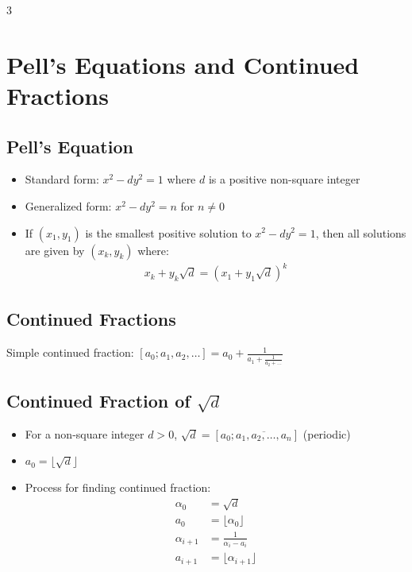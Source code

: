 \documentclass[8,a4paper]{article}
\begin{document}
\begin{multicols}{3}
	\section{Pell's Equations and Continued Fractions}

	\subsection{Pell's Equation}
	\begin{itemize}[leftmargin=*]
		\item Standard form: $x^2 - dy^2 = 1$ where $d$ is a positive non-square integer
		\item Generalized form: $x^2 - dy^2 = n$ for $n \neq 0$
		\item If $(x_1, y_1)$ is the smallest positive solution to $x^2 - dy^2 = 1$, then all solutions are given by $(x_k, y_k)$ where:
		      \begin{align*}
			      x_k + y_k\sqrt{d} = (x_1 + y_1\sqrt{d})^k
		      \end{align*}
	\end{itemize}

	\subsection{Continued Fractions}
	Simple continued fraction: $[a_0; a_1, a_2, \ldots] = a_0 + \frac{1}{a_1 + \frac{1}{a_2 + \ldots}}$

	\subsection{Continued Fraction of $\sqrt{d}$}
	\begin{itemize}[leftmargin=*]
		\item For a non-square integer $d > 0$, $\sqrt{d} = [a_0; \overline{a_1, a_2, \ldots, a_n}]$ (periodic)
		\item $a_0 = \lfloor \sqrt{d} \rfloor$
		\item Process for finding continued fraction:
		      \begin{align*}
			      \alpha_0     & = \sqrt{d}                     \\
			      a_0          & = \lfloor \alpha_0 \rfloor     \\
			      \alpha_{i+1} & = \frac{1}{\alpha_i - a_i}     \\
			      a_{i+1}      & = \lfloor \alpha_{i+1} \rfloor
		      \end{align*}
	\end{itemize}


\end{multicols}
\end{document}
